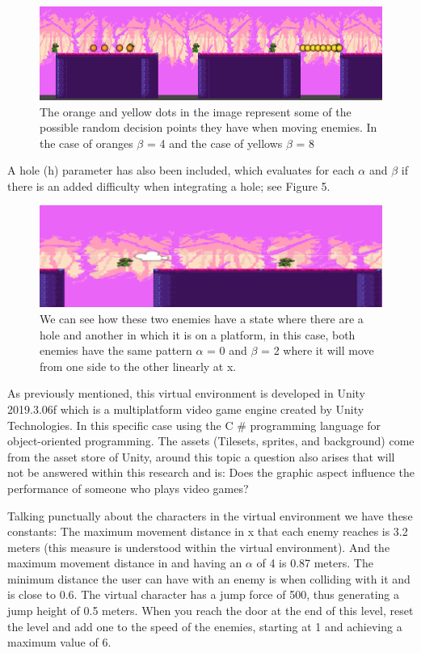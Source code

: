 \begin{figure}[ht]
    \centering
      \includegraphics[width=\linewidth]{Figures/betapath.png}
      \caption{The orange and yellow dots in the image represent some of the possible random decision points they have when moving enemies. In the case of oranges $\beta$ = 4 and the case of yellows $\beta$ = 8}
    \label{fig:example}
\end{figure}

A hole (h) parameter has also been included, which evaluates for each $\alpha$ and $\beta$ if there is an added difficulty when integrating a hole; see Figure 5.

\begin{figure}[ht]
    \centering
      \includegraphics[width=\linewidth]{Figures/holev.png}
      \caption{We can see how these two enemies have a state where there are a hole and another in which it is on a platform, in this case, both enemies have the same pattern $\alpha$ = 0 and $\beta$ = 2 where it will move from one side to the other linearly at x.}
    \label{fig:example}
\end{figure}

As previously mentioned, this virtual environment is developed in Unity 2019.3.06f which is a multiplatform video game engine created by Unity Technologies. In this specific case using the C \# programming language for object-oriented programming. The assets (Tilesets, sprites, and background) come from the asset store of Unity, around this topic a question also arises that will not be answered within this research and is: Does the graphic aspect influence the performance of someone who plays video games?

Talking punctually about the characters in the virtual environment we have these constants:
The maximum movement distance in x that each enemy reaches is 3.2 meters (this measure is understood within the virtual environment). And the maximum movement distance in and having an $\alpha$ of 4 is 0.87 meters.
The minimum distance the user can have with an enemy is when colliding with it and is close to 0.6.
The virtual character has a jump force of 500, thus generating a jump height of 0.5 meters. When you reach the door at the end of this level, reset the level and add one to the speed of the enemies, starting at 1 and achieving a maximum value of 6.


